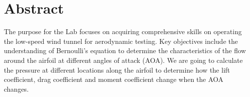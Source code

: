 \thispagestyle{plain} %



\chapter*{Abstract} %

The purpose for the Lab focuses on acquiring comprehensive skills on operating the low-speed wind tunnel for aerodynamic testing. Key objectives include the understanding of Bernoulli's equation to determine the characteristics of the flow around the airfoil at different angles of attack (AOA). We are going to calculate the pressure at different locations along the airfoil to determine how the lift coefficient, drag coefficient and moment coefficient change when the AOA changes. 



